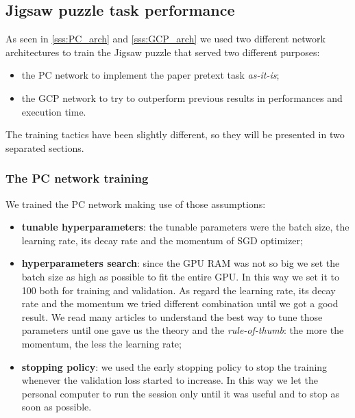 \subsection{Jigsaw puzzle task performance}
As seen in \ref{sss:PC_arch} and \ref{sss:GCP_arch} we used two different network architectures to train the Jigsaw puzzle that served two different purposes:
\begin{itemize}
    \item the PC network to implement the paper pretext task \emph{as-it-is};
    \item the GCP network to try to outperform previous results in performances and execution time.
\end{itemize}
The training tactics have been slightly different, so they will be presented in two separated sections.

\subsubsection{The PC network training}\label{sss:PC_training}
We trained the PC network making use of those assumptions:
\begin{itemize}
    \item \textbf{tunable hyperparameters}: the tunable parameters were the batch size, the learning rate, its decay rate and the momentum of SGD optimizer;
    \item \textbf{hyperparameters search}: since the GPU RAM was not so big we set the batch size as high as possible to fit the entire GPU. In this way we set it to 100 both for training and validation. As regard the learning rate, its decay rate and the momentum we tried different combination until we got a good result. We read many articles to understand the best way to tune those parameters until one \cite{SGD_momentum} gave us the theory and the \textit{rule-of-thumb}: the more the momentum, the less the learning rate;
    \item \textbf{stopping policy}: we used the early stopping policy to stop the training whenever the validation loss started to increase. In this way we let the personal computer to run the session only until it was useful and to stop as soon as possible.
\end{itemize}

